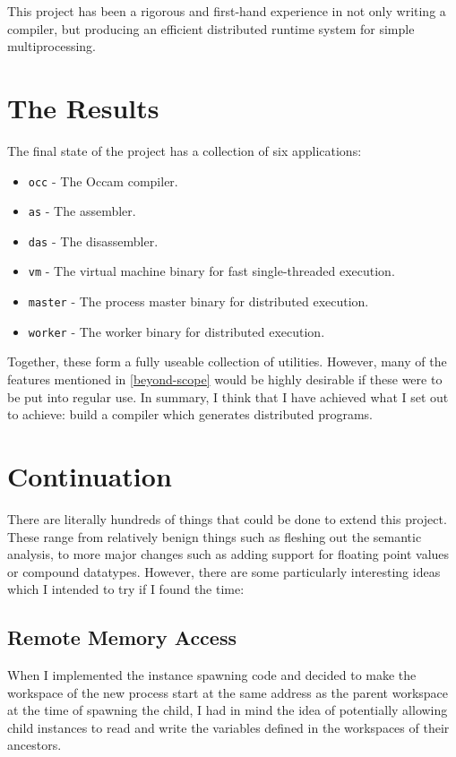 This project has been a rigorous and first-hand experience in not only writing
a compiler, but producing an efficient distributed runtime system for
simple multiprocessing.

\section{The Results}

The final state of the project has a collection of six applications:

\begin{itemize}
  \item \texttt{occ} - The Occam compiler.
  \item \texttt{as} - The assembler.
  \item \texttt{das} - The disassembler.
  \item \texttt{vm} - The virtual machine binary for fast single-threaded execution.
  \item \texttt{master} - The process master binary for distributed execution.
  \item \texttt{worker} - The worker binary for distributed execution.
\end{itemize}

Together, these form a fully useable collection of utilities. However, many of
the features mentioned in \ref{beyond-scope} would be highly desirable if these
were to be put into regular use. In summary, I think that I have achieved what
I set out to achieve: build a compiler which generates distributed programs.

\section{Continuation}

There are literally hundreds of things that could be done to extend this
project. These range from relatively benign things such as fleshing out the
semantic analysis, to more major changes such as adding support for floating
point values or compound datatypes. However, there are some particularly
interesting ideas which I intended to try if I found the time:

\subsection{Remote Memory Access}

When I implemented the instance spawning code and decided to make the workspace
of the new process start at the same address as the parent workspace at the time
of spawning the child, I had in mind the idea of potentially allowing child
instances to read and write the variables defined in the workspaces of their
ancestors.

